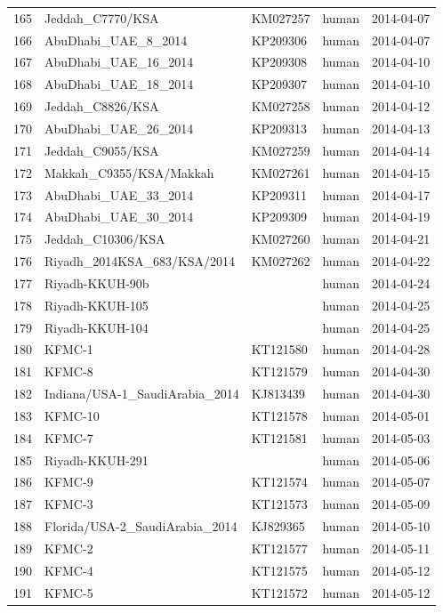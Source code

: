 \documentclass[11pt,oneside,letterpaper]{article}
\begin{document}
\begin{longtable}{ | l | l | l | l | l | }
  165 & Jeddah\_C7770/KSA & KM027257 & human & 2014-04-07 \\
  166 & AbuDhabi\_UAE\_8\_2014 & KP209306 & human & 2014-04-07 \\
  167 & AbuDhabi\_UAE\_16\_2014 & KP209308 & human & 2014-04-10 \\
  168 & AbuDhabi\_UAE\_18\_2014 & KP209307 & human & 2014-04-10 \\
  169 & Jeddah\_C8826/KSA & KM027258 & human & 2014-04-12 \\
  170 & AbuDhabi\_UAE\_26\_2014 & KP209313 & human & 2014-04-13 \\
  171 & Jeddah\_C9055/KSA & KM027259 & human & 2014-04-14 \\
  172 & Makkah\_C9355/KSA/Makkah & KM027261 & human & 2014-04-15 \\
  173 & AbuDhabi\_UAE\_33\_2014 & KP209311 & human & 2014-04-17 \\
  174 & AbuDhabi\_UAE\_30\_2014 & KP209309 & human & 2014-04-19 \\
  175 & Jeddah\_C10306/KSA & KM027260 & human & 2014-04-21 \\
  176 & Riyadh\_2014KSA\_683/KSA/2014 & KM027262 & human & 2014-04-22 \\
  177 & Riyadh-KKUH-90b &  & human & 2014-04-24 \\
  178 & Riyadh-KKUH-105 &  & human & 2014-04-25 \\
  179 & Riyadh-KKUH-104 &  & human & 2014-04-25 \\
  180 & KFMC-1 & KT121580 & human & 2014-04-28 \\
  181 & KFMC-8 & KT121579 & human & 2014-04-30 \\
  182 & Indiana/USA-1\_SaudiArabia\_2014 & KJ813439 & human & 2014-04-30 \\
  183 & KFMC-10 & KT121578 & human & 2014-05-01 \\
  184 & KFMC-7 & KT121581 & human & 2014-05-03 \\
  185 & Riyadh-KKUH-291 &  & human & 2014-05-06 \\
  186 & KFMC-9 & KT121574 & human & 2014-05-07 \\
  187 & KFMC-3 & KT121573 & human & 2014-05-09 \\
  188 & Florida/USA-2\_SaudiArabia\_2014 & KJ829365 & human & 2014-05-10 \\
  189 & KFMC-2 & KT121577 & human & 2014-05-11 \\
  190 & KFMC-4 & KT121575 & human & 2014-05-12 \\
  191 & KFMC-5 & KT121572 & human & 2014-05-12 \\

\end{longtable}
\end{document}
